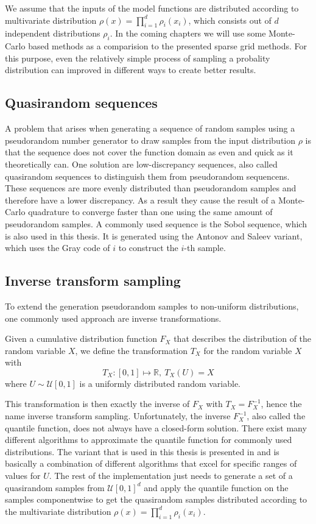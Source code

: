 \documentclass[
  a4paper,  %
  twoside,  %
  bibliography=totoc,
  headsepline,
  cleardoublepage=empty,
  parskip=half,
  draft=false
]{scrbook}
\begin{document}
We assume that the inputs of the model functions are distributed according to multivariate distribution $\rho(x)=\prod_{i=1}^d \rho_i(x_i)$, which consists out of $d$ independent distributions $\rho_i$.
In the coming chapters we will use some Monte-Carlo based methods as a comparision to the presented sparse grid methods.
For this purpose, even the relatively simple process of sampling a probality distribution can improved in different ways to create better results.

\subsection{Quasirandom sequences}

A problem that arises when generating a sequence of random samples using a pseudorandom number generator to draw samples from the input distribution $\rho$ is that the sequence does not cover the function domain as even and quick as it theoretically can.
One solution are low-discrepancy sequences, also called quasirandom sequences to distinguish them from pseudorandom sequencens.
These sequences are more evenly distributed than pseudorandom samples and therefore have a lower discrepancy.
As a result they cause the result of a Monte-Carlo quadrature to converge faster than one using the same amount of pseudorandom samples.
A commonly used sequence is the Sobol sequence, which is also used in this thesis.
It is generated using the Antonov and Saleev variant, which uses the Gray code of $i$ to construct the $i$-th sample.

\subsection{Inverse transform sampling}
To extend the generation pseudorandom samples to non-uniform distributions, one commonly used approach are inverse transformations.
\begin{definition}
Given a cumulative distribution function $F_X$ that describes the distribution of the random variable $X$, we define the transformation $T_X$ for the random variable $X$ with
\begin{equation}
T_X \colon [0,1] \mapsto \mathds{R}, ~ T_X(U)=X
\end{equation}
where $U \sim \mathcal{U}[0,1]$ is a uniformly distributed random variable.
\end{definition}
This transformation is then exactly the inverse of $F_X$ with $T_X=F_X^{-1}$, hence the name inverse transform sampling.
Unfortunately, the inverse $F_X^{-1}$, also called the quantile function, does not always have a closed-form solution.
There exist many different algorithms to approximate the quantile function for commonly used distributions.
The variant that is used in this thesis is presented in \cite{} and is basically a combination of different algorithms that excel for specific ranges of values for $U$.
The rest of the implementation just needs to generate a set of a quasirandom samples from $\mathcal{U}[0,1]^d$ and apply the quantile function on the samples componentwise to get the quasirandom samples distributed according to the multivariate distribution $\rho(x)=\prod_{i=1}^d \rho_i(x_i)$.
\end{document}
